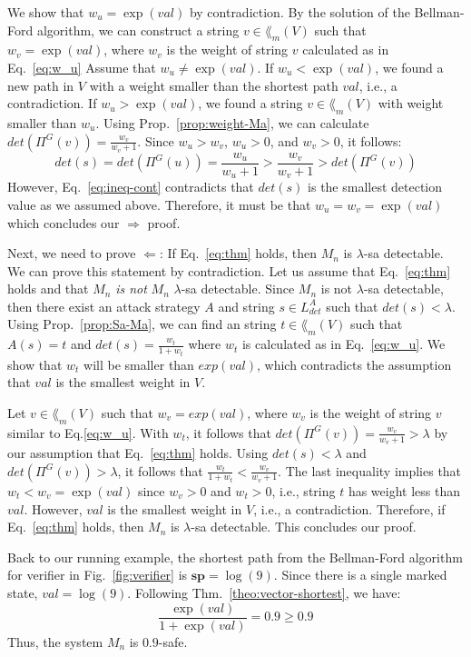 We show that $w_u = \exp(val)$ by contradiction.
By the solution of the Bellman-Ford algorithm, we can construct a string $v\in \lang_m(V)$ such that $w_v = \exp(val)$, where $w_v$ is the weight of string $v$ calculated as in Eq.~\ref{eq:w_u}
Assume that $w_u\neq \exp(val)$.
If $w_u<\exp(val)$, we found a new path in $V$ with a weight smaller than the shortest path $val$, i.e., a contradiction.
If $w_u>\exp(val)$, we found a string $v\in \lang_m(V)$ with weight smaller than $w_u$.
Using Prop.~\ref{prop:weight-Ma}, we can calculate $det(\Pi^G(v)) = \frac{w_v}{w_v+1}$.
Since $w_u>w_v$, $w_u>0$, and $w_v>0$, it follows: 
\begin{equation}\label{eq:ineq-cont}
det(s) = det(\Pi^G(u)) = \frac{w_u}{w_u+1}> \frac{w_v}{w_v+1}>det(\Pi^G(v))
\end{equation}
However, Eq.~\ref{eq:ineq-cont} contradicts that $det(s)$ is the smallest detection value as we assumed above.
Therefore, it must be that $w_u = w_v = \exp(val)$ which concludes our $\Rightarrow$ proof.

Next, we need to prove $\Leftarrow$: If Eq.~\ref{eq:thm} holds, then $M_n$ is $\lambda$-sa detectable.
We can prove this statement by contradiction.
Let us assume that Eq.~\ref{eq:thm} holds and that $M_n$ \emph{is not} $M_n$ $\lambda$-sa detectable.
Since $M_n$ is not $\lambda$-sa detectable, then there exist an attack strategy $A$ and string $s\in L_{det}^A$ such that $det(s)<\lambda$.
Using Prop.~\ref{prop:Sa-Ma}, we can find an string $t\in \lang_m(V)$ such that $A(s) = t$ and $det(s) = \frac{w_t}{1+w_t}$ where $w_t$ is calculated as in Eq.~\ref{eq:w_u}.
We show that $w_t$ will be smaller than $exp(val)$, which contradicts the assumption that $val$ is the smallest weight in $V$.

Let $v\in \lang_m(V)$ such that $w_v = exp(val)$, where $w_v$ is the weight of string $v$ similar to Eq.\ref{eq:w_u}.
With $w_t$, it follows that $det(\Pi^G(v)) = \frac{w_v}{w_v+1}>\lambda$ by our assumption that Eq.~\ref{eq:thm} holds.
Using $det(s)<\lambda$ and $det(\Pi^G(v))>\lambda$, it follows that  $\frac{w_t}{1+w_t}<\frac{w_v}{w_v+1}$.
The last inequality implies that $w_t<w_v = \exp(val)$ since $w_v>0$ and $w_t>0$, i.e., string $t$ has weight less than $val$.
However, $val$ is the smallest weight in $V$, i.e., a contradiction.
Therefore, if Eq.~\ref{eq:thm} holds, then $M_n$ is $\lambda$-sa detectable.
This concludes our proof.
\endproof

Back to our running example, the shortest path from the Bellman-Ford algorithm for verifier in Fig.~\ref{fig:verifier} is $\mathbf{sp} = \log(9)$.
Since there is a single marked state, $val = \log(9)$.
Following Thm.~\ref{theo:vector-shortest}, we have:
\begin{equation}
\frac{\exp(val)}{1+\exp(val)}=0.9\geq 0.9
\end{equation}
Thus, the system $M_n$ is $0.9$-safe.

